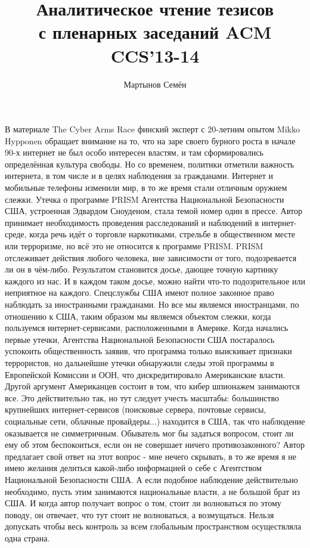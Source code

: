 \documentclass[10pt,a4paper]{article}
\author{Мартынов Семён}
\title{Аналитическое чтение тезисов\\ с пленарных заседаний ACM CCS'13-14}
\begin{document}
\maketitle

\begin{multicols}{2}
В материале The Cyber Arms Race финский эксперт с 20-летним опытом Mikko Hypponen обращает внимание на то, что на заре своего бурного роста в начале 90-х интернет не был особо интересен властям, и там сформировались определённая культура свободы. Но со временем, политики отметили важность интернета, в том числе и в целях наблюдения за гражданами. Интернет и мобильные телефоны изменили мир, в то же время стали отличным оружием слежки. Утечка о программе PRISM Агентства Национальной Безопасности США, устроенная Эдвардом Сноуденом, стала темой номер один в прессе.
Автор принимает необходимость проведения расследований и наблюдений в интернет-среде, когда речь идёт о торговле наркотиками, стрельбе в общественном месте или терроризме, но всё это не относится к программе PRISM. PRISM отслеживает действия любого человека, вне зависимости от того, подозревается ли он в чём-либо. Результатом становится досье, дающее точную картинку каждого из нас. И в каждом таком досье, можно найти что-то подозрительное или неприятное на каждого.
Спецслужбы США имеют полное законное право наблюдать за иностранными гражданами. Но все мы являемся иностранцами, по отношению к США, таким образом мы являемся объектом слежки, когда пользуемся интернет-сервисами, расположенными в Америке.
Когда начались первые утечки, Агентства Национальной Безопасности США постаралось успокоить общественность заявив, что программа только выискивает признаки террористов, но дальнейшие утечки обнаружили следы этой программы в Европейской Комиссии и ООН, что дискредитировало Американские власти.
Другой аргумент Американцев состоит в том, что кибер шпионажем занимаются все. Это действительно так, но тут следует учесть масштабы: большинство крупнейших интернет-сервисов (поисковые сервера, почтовые сервисы, социальные сети, облачные провайдеры...) находится в США, так что наблюдение оказывается не симметричным.
Обыватель мог бы задаться вопросом, стоит ли ему об этом беспокоиться, если он не совершает ничего противозаконного? Автор предлагает свой ответ на этот вопрос - мне нечего скрывать, в то же время я не имею желания делиться какой-либо информацией о себе с Агентством Национальной Безопасности США. А если подобное наблюдение действительно необходимо, пусть этим занимаются национальные власти, а не большой брат из США. И когда автор получает вопрос о том, стоит ли волноваться по этому поводу, он отвечает, что тут стоит не волноваться, а возмущаться. Нельзя допускать чтобы весь контроль за всем глобальным пространством осуществляла одна страна.



\end{multicols}
\end{document}
